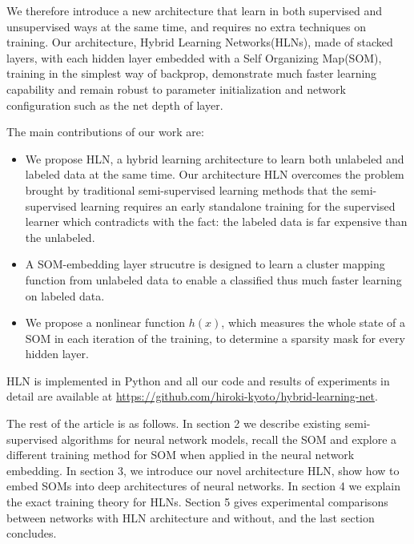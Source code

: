 \documentclass[3p,times,procedia]{elsarticle}
\begin{document}
We therefore introduce a new architecture
that learn in both supervised and 
unsupervised ways at the same time,
and requires no extra techniques on
training. Our architecture, Hybrid
Learning Networks(HLNs), made of 
stacked layers, with each hidden
layer embedded with a Self Organizing
Map(SOM), training in
the simplest way of backprop, 
demonstrate much faster learning
capability and remain robust to 
parameter initialization and
network configuration such as the net
depth of layer.

The main contributions of our work are:
\begin{itemize}
\item
	We propose HLN, a hybrid learning
	architecture to learn both unlabeled 
		and labeled data at the same time.
		Our architecture HLN overcomes
the problem brought by traditional 
semi-supervised learning methods that 
the semi-supervised learning requires
an early standalone training for the
supervised learner which contradicts
with the fact: the labeled data is far
		expensive than the unlabeled.
\item A SOM-embedding layer strucutre is 
	designed to learn a cluster 
mapping function from unlabeled data
		to enable a classified
thus much faster learning on labeled
data.
\item We propose a nonlinear function $h(x)$,
	which measures the whole state of a
		SOM in each iteration of the 
		training, to determine a sparsity
		mask for every hidden layer.
\end{itemize}
HLN is implemented in Python and all
our code and results of experiments
in detail are available at
\url{https://github.com/hiroki-kyoto/hybrid-learning-net}.

The rest of the article is as follows.
In section 2 we describe existing
semi-supervised algorithms for neural
network models, recall
the SOM and explore a different
training method for SOM when applied in
the neural network embedding.
In section 3, we introduce our novel
architecture HLN, show how to
embed SOMs into deep architectures of
neural networks.
In section 4 we explain the exact 
training theory for HLNs.
Section 5 gives experimental
comparisons between networks with HLN
architecture and without, and the
last section concludes.
\end{document}
